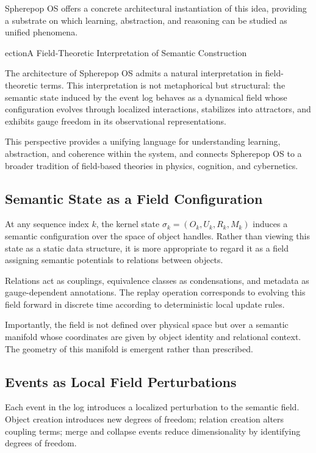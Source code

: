 \documentclass[11pt]{article}
\begin{document}
Spherepop OS offers a concrete architectural instantiation of this idea,
providing a substrate on which learning, abstraction, and reasoning can be
studied as unified phenomena.



ection{A Field-Theoretic Interpretation of Semantic Construction}

The architecture of Spherepop OS admits a natural interpretation in
field-theoretic terms. This interpretation is not metaphorical but
structural: the semantic state induced by the event log behaves as a
dynamical field whose configuration evolves through localized
interactions, stabilizes into attractors, and exhibits gauge freedom in
its observational representations.

This perspective provides a unifying language for understanding learning,
abstraction, and coherence within the system, and connects Spherepop OS to
a broader tradition of field-based theories in physics, cognition, and
cybernetics.

\subsection{Semantic State as a Field Configuration}

At any sequence index $k$, the kernel state $\sigma_k = (O_k, U_k, R_k, M_k)$
induces a semantic configuration over the space of object handles. Rather
than viewing this state as a static data structure, it is more appropriate
to regard it as a field assigning semantic potentials to relations between
objects.

Relations act as couplings, equivalence classes as condensations, and
metadata as gauge-dependent annotations. The replay operation corresponds
to evolving this field forward in discrete time according to deterministic
local update rules.

Importantly, the field is not defined over physical space but over a
semantic manifold whose coordinates are given by object identity and
relational context. The geometry of this manifold is emergent rather than
prescribed.

\subsection{Events as Local Field Perturbations}

Each event in the log introduces a localized perturbation to the semantic
field. Object creation introduces new degrees of freedom; relation
creation alters coupling terms; merge and collapse events reduce
dimensionality by identifying degrees of freedom.
\end{document}

